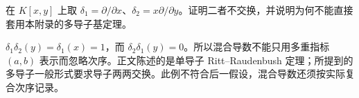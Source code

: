 \begin{exercise}\label{b3:ex:E-commuting-derivations}
	在 \(K[x,y]\) 上取 \(\delta_1=\partial/\partial x\)、\(\delta_2=x\partial/\partial y\)。证明二者不交换，并说明为何不能直接套用本附录的多导子基定理。
\end{exercise}
\begin{solution}
	\(\delta_1\delta_2(y)=\delta_1(x)=1\)，而 \(\delta_2\delta_1(y)=0\)。所以混合导数不能只用多重指标 \((a,b)\) 表示而忽略次序。正文陈述的是单导子 Ritt--Raudenbush 定理；所提到的多导子一般形式要求导子两两交换。此例不符合后一假设，混合导数还须按实际复合次序记录。
\end{solution}
